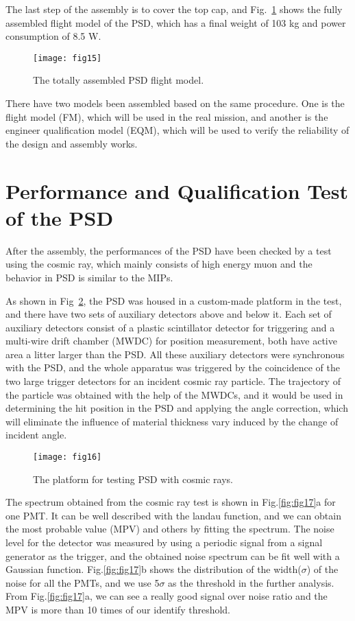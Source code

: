 \documentclass[preprint]{elsarticle}
\begin{document}
The last step of the assembly is to cover the top cap, and Fig.~\ref{fig:fig15} shows the fully assembled flight model of the PSD, which has a final weight of 103 kg and power consumption of 8.5 W.

\begin{figure}
 \centering
 \texttt{[image: fig15]}
\caption{The totally assembled PSD flight model.}
\label{fig:fig15}
\end{figure}

There have two models been assembled based on the same procedure. One is the flight model (FM), which will be used in the real mission, and another is the engineer qualification model (EQM), which will be used to verify the reliability of the design and assembly works.

\section{Performance and Qualification Test of the PSD}

After the assembly, the performances of the PSD have been checked by a test using the cosmic ray, which mainly consists of high energy muon and the behavior in PSD is similar to the MIPs.

As shown in Fig~\ref{fig:fig16}, the PSD was housed in a custom-made platform in the test, and there have two sets of auxiliary detectors above and below it. Each set of auxiliary detectors consist of a plastic scintillator detector for triggering and a multi-wire drift chamber (MWDC) for position measurement, both have active area a litter larger than the PSD. All these auxiliary detectors were synchronous with the PSD, and the whole apparatus was triggered by the coincidence of the two large trigger detectors for an incident cosmic ray particle. The trajectory of the particle was obtained with the help of the MWDCs, and it would be used in determining the hit position in the PSD and applying the angle correction, which will eliminate the influence of material thickness vary induced by the change of incident angle.

\begin{figure}
 \centering
 \texttt{[image: fig16]}
\caption{The platform for testing PSD with cosmic rays. }
\label{fig:fig16}
\end{figure}

The spectrum obtained from the cosmic ray test is shown in Fig.\ref{fig:fig17}a for one PMT. It can be well described with the landau function, and we can obtain the most probable value (MPV) and others by fitting the spectrum. The noise level for the detector was measured by using a periodic signal from a signal generator as the trigger, and the obtained noise spectrum can be fit well with a Gaussian function. Fig.\ref{fig:fig17}b shows the distribution of the width($\sigma$) of the noise for all the PMTs, and we use 5$\sigma$ as the threshold in the further analysis. From Fig.\ref{fig:fig17}a, we can see a really good signal over noise ratio and the MPV is more than 10 times of our identify threshold.
\end{document}
